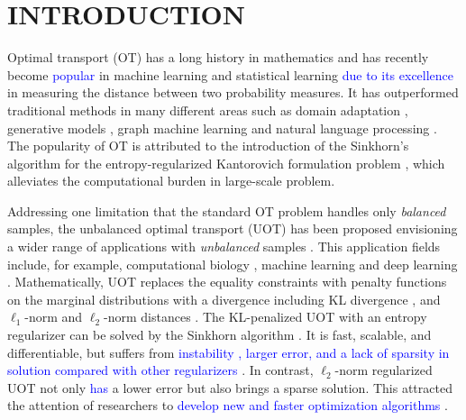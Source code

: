 \documentclass[twoside]{article}
\theoremstyle{plain}
\newcommand{\changeXS}[1]{\textcolor{blue}{#1}}
\begin{document}
\section{INTRODUCTION}
\label{sec:int}
Optimal transport (OT) has a long history in mathematics and has recently become \changeXS{popular} in machine learning and statistical learning \changeXS{due to its excellence }in measuring the distance between two probability measures. It has outperformed traditional methods in many different areas such as domain adaptation \citep{Courty_PAMI_2017}, generative models \citep{arjovsky2017wasserstein}, graph machine learning \citep{Maretic_NIPS_2019} and natural language processing \citep{Chen_ICLR_2019}. The popularity of OT is attributed to the introduction of the Sinkhorn's algorithm \citep{Sinkhorn_1974} for the entropy-regularized Kantorovich formulation problem \citep{Cuturi_NIPS_2013}, which alleviates the computational burden in large-scale problem. 

Addressing one limitation that the standard OT problem handles only {\it balanced} samples, the unbalanced optimal transport (UOT) has been proposed envisioning a wider range of applications with {\it unbalanced} samples \citep{Caffarelli_AM_2010,chizat2017scaling}. This application fields include, for example, computational biology \citep{Schiebinger_CELL_2019}, machine learning \citep{Janati_AISTATS_2019} and deep learning \citep{Yang_ICLR_2019}. Mathematically, UOT replaces the equality constraints with penalty functions on the marginal distributions with a divergence including KL divergence \citep{Liero:2018wo}, and $\ell_1$-norm \citep{Caffarelli_AM_2010} and $\ell_2$-norm distances \citep{refId0}. The KL-penalized UOT with an entropy regularizer can be solved by the Sinkhorn algorithm \citep{UOTSinkhorn2020}. It is fast, scalable, and differentiable, but suffers from \changeXS{instability \citep{DBLP:journals/corr/Schmitzer16}, larger error, and a lack of sparsity in solution compared with other regularizers} \citep{Blondel_AISTATS_2018}. In contrast, $\ell_2$-norm regularized UOT not only \changeXS{has} a lower error but also brings a sparse solution. This attracted the attention of researchers to \changeXS{develop new and faster optimization algorithms} \citep{Blondel_AISTATS_2018, Nguyen_arXiv_2022}.
\end{document}
